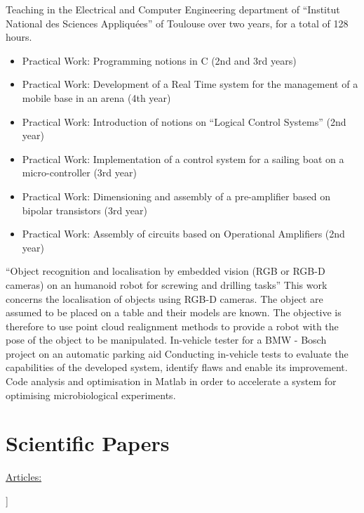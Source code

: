 \documentclass[11pt,a4paper,sans]{moderncv}         %
\begin{document}
{}{
  Teaching in the Electrical and Computer Engineering department of ``Institut National des Sciences Appliqu\'ees'' of Toulouse over two years, for a total of 128 hours.
  \begin{itemize}
    \item Practical Work: Programming notions in C (2nd and 3rd years)
    \item Practical Work: Development of a Real Time system for the management of a mobile base in an arena (4th year)
    \item Practical Work: Introduction of notions on ``Logical Control Systems'' (2nd year)
    \item Practical Work: Implementation of a control system for a sailing boat on a micro-controller (3rd year)
    \item Practical Work: Dimensioning and assembly of a pre-amplifier based on bipolar transistors (3rd year)
    \item Practical Work: Assembly of circuits based on Operational Amplifiers (2nd year)
  \end{itemize}
}
%
{``Object recognition and localisation by embedded vision (RGB or RGB-D cameras) on an humanoid robot for screwing and drilling tasks''}{
This work concerns the localisation of objects using RGB-D cameras.
The object are assumed to be placed on a table and their models are known.
The objective is therefore to use point cloud realignment methods to provide a robot with the pose of the object to be manipulated.
}
%
{In-vehicle tester for a BMW - Bosch project on an automatic parking aid}{
  Conducting in-vehicle tests to evaluate the capabilities of the developed system, identify flaws and enable its improvement.
}
%
{Code analysis and optimisation in Matlab in order to accelerate a system for optimising microbiological experiments.
}

\section{Scientific Papers}

\toggletrue{myrefs}

\large{\underline{Articles:}}

\begin{itemize}%
\normalsize{\item[[1]\hspace{-2mm}]} \normalsize{}
\end{itemize}
\end{document}
